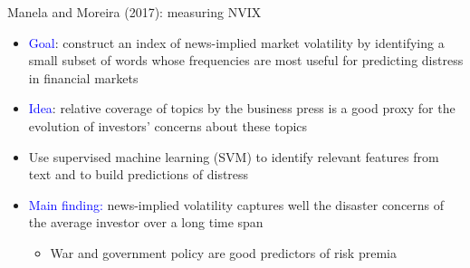 \documentclass[english]{beamer}
\begin{document}
\begin{frame}{Manela and Moreira (2017): measuring NVIX}
\begin{itemize}
\setlength{\itemsep}{1.5em}
\item \textcolor{blue}{Goal}: construct an index of news-implied market volatility by identifying a small subset of words whose frequencies are most useful for predicting distress in financial markets

\item \textcolor{blue}{Idea}: relative coverage of topics by the business press is a good proxy for the evolution of investors' concerns about these topics
\item Use supervised machine learning (SVM) to identify relevant features from text and to build predictions of distress
\item \textcolor{blue}{Main finding:} news-implied volatility captures well the disaster concerns of the average investor over a long time span
\begin{itemize}
    \item War and government policy are good predictors of risk premia
\end{itemize}
\end{itemize}
\end{frame}%
\end{document}

